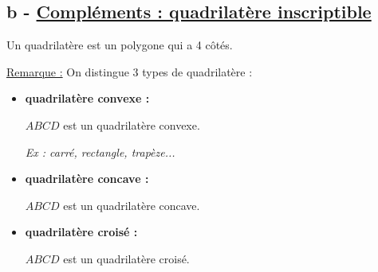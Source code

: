 \documentclass[12pt,a4paper]{article}
\begin{document}
\subsection*{%
    \color{monRouge}b - \underline{Compléments : quadrilatère inscriptible}%
}

\noindent Un quadrilatère est un polygone qui a 4 côtés.

\vspace{1em}

\noindent \textcolor{monRouge}{\underline{Remarque :}} On distingue 3 types de quadrilatère :

\begin{itemize}
    \item[*] \textbf{quadrilatère convexe :}
    
    \begin{minipage}{0.4\textwidth}
    \end{minipage}
    \begin{minipage}{0.5\textwidth}
        $ABCD$ est un quadrilatère convexe.
    \end{minipage}
    
    \textit{Ex : carré, rectangle, trapèze...}

    \vspace{1em}

    \item[*] \textbf{quadrilatère concave :}
    
    \begin{minipage}{0.4\textwidth}
    \end{minipage}
    \begin{minipage}{0.5\textwidth}
        $ABCD$ est un quadrilatère concave.
    \end{minipage}

    \vspace{1em}

    \item[*] \textbf{quadrilatère croisé :}
    
    \begin{minipage}{0.4\textwidth}
    \end{minipage}
    \begin{minipage}{0.5\textwidth}
        $ABCD$ est un quadrilatère croisé.
    \end{minipage}
\end{itemize}
\end{document}
